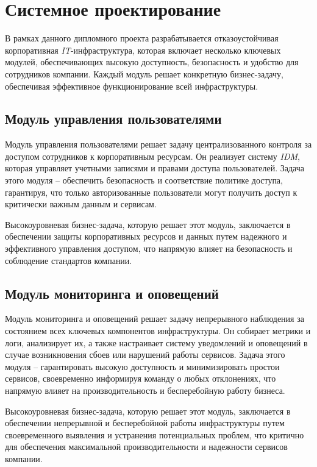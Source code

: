 \section{Системное проектирование}

В рамках данного дипломного проекта разрабатывается отказоустойчивая корпоративная \textit{IT}-инфраструктура, которая включает несколько ключевых модулей, обеспечивающих высокую доступность, безопасность и удобство для сотрудников компании. Каждый модуль решает конкретную бизнес-задачу, обеспечивая эффективное функционирование всей инфраструктуры.

\subsection{Модуль управления пользователями} 
\label{sec:user_management_module}

Модуль управления пользователями решает задачу централизованного контроля за доступом сотрудников к корпоративным ресурсам. Он реализует систему \textit{IDM}, которая управляет учетными записями и правами доступа пользователей. Задача этого модуля -- обеспечить безопасность и соответствие политике доступа, гарантируя, что только авторизованные пользователи могут получить доступ к критически важным данным и сервисам.

Высокоуровневая бизнес-задача, которую решает этот модуль, заключается в обеспечении защиты корпоративных ресурсов и данных путем надежного и эффективного управления доступом, что напрямую влияет на безопасность и соблюдение стандартов компании.

\subsection{Модуль мониторинга и оповещений} 
\label{sec:monitoring_alerting_module}

Модуль мониторинга и оповещений решает задачу непрерывного наблюдения за состоянием всех ключевых компонентов инфраструктуры. Он собирает метрики и логи, анализирует их, а также настраивает систему уведомлений и оповещений в случае возникновения сбоев или нарушений работы сервисов. Задача этого модуля -- гарантировать высокую доступность и минимизировать простои сервисов, своевременно информируя команду о любых отклонениях, что напрямую влияет на производительность и бесперебойную работу бизнеса.

Высокоуровневая бизнес-задача, которую решает этот модуль, заключается в обеспечении непрерывной и бесперебойной работы инфраструктуры путем своевременного выявления и устранения потенциальных проблем, что критично для обеспечения максимальной производительности и надежности сервисов компании.

